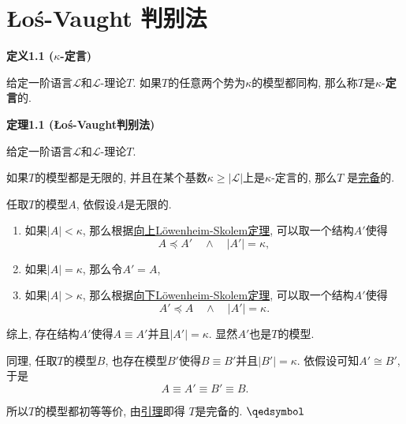 \documentclass[UTF8]{ctexart}
\begin{document}
\setlength{\abovedisplayskip}{1pt}
\setlength{\belowdisplayskip}{1pt}

\section{Łoś-Vaught 判别法}

\hypertarget{sec:定义1.1}{}
\noindent\textbf{定义1.1 ($\kappa$-定言)}

给定一阶语言$\mathcal{L}$和$\mathcal{L}$-理论$T$.
如果$T$的任意两个势为$\kappa$的模型都同构, 那么称$T$是$\kappa$-\textbf{定言}的.

\vspace{10pt}

\hypertarget{sec:定理1.1}{}
\noindent\textbf{定理1.1 (Łoś-Vaught判别法)}

给定一阶语言$\mathcal{L}$和$\mathcal{L}$-理论$T$.

如果$T$的模型都是无限的,
并且在某个基数$\kappa\geqslant|\mathcal{L}|$上是$\kappa$-定言的, 那么$T$
是\href{../02 一阶语义/03 一阶理论与模型#nameddest=sec:定义2.1}{完备}的.


任取$T$的模型$A$, 依假设$A$是无限的.
\begin{enumerate}
    \item 如果$|A|<\kappa$,
    那么根据\href{03 Löwenheim-Skolem 定理#nameddest=sec:定理2.1}
    {向上Löwenheim-Skolem定理}, 可以取一个结构$A'$使得
    \[
        A\preccurlyeq A'\quad\land\quad|A'|=\kappa,
    \]
    \item 如果$|A|=\kappa$, 那么令$A'=A$,
    \item 如果$|A|>\kappa$,
    那么根据\href{03 Löwenheim-Skolem 定理#nameddest=sec:定理1.1}
    {向下Löwenheim-Skolem定理}, 可以取一个结构$A'$使得
    \[
        A'\preccurlyeq A\quad\land\quad|A'|=\kappa.
    \]
\end{enumerate}

综上, 存在结构$A'$使得$A\equiv A'$并且$|A'|=\kappa$. 显然$A'$也是$T$的模型.

同理, 任取$T$的模型$B$, 也存在模型$B'$使得$B\equiv B'$并且$|B'|=\kappa$.
依假设可知$A'\cong B'$, 于是
\[
    A\equiv A'\equiv B'\equiv B.
\]


所以$T$的模型都初等等价,
由\href{../02 一阶语义/03 一阶理论与模型#nameddest=sec:定理2.1}{引理}即得
$T$是完备的. \hfill $\qedsymbol$
\end{document}
